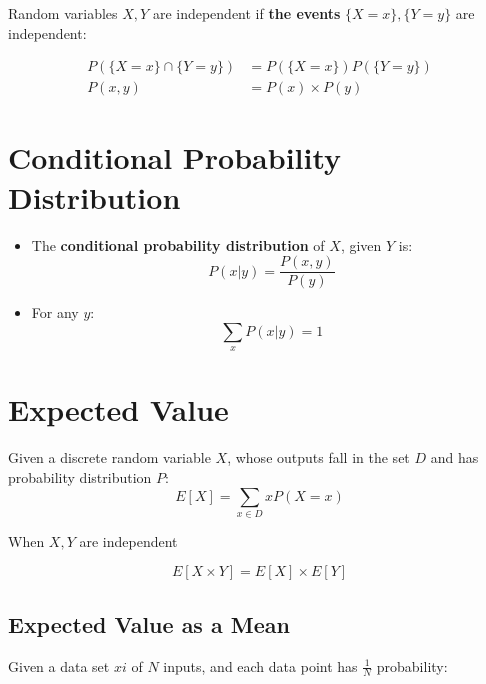   Random variables $ X, Y $ are independent if \textbf{the events} $ \{ X = x \}, \{ Y = y \} $ are independent:

  \begin{align}
    P(\{ X = x \} \cap \{ Y = y \}) &= P(\{ X = x \}) P(\{ Y = y \}) \\
    P(x,y) &= P(x) \times P(y)
  \end{align}

\section{Conditional Probability Distribution}

  \begin{itemize}
    \item The \textbf{conditional probability distribution} of $ X $, given $ Y $ is:
    \begin{equation}
      P(x | y) = \frac{ P(x, y) }{ P(y) }
    \end{equation}

    \item For any $ y $:
    \begin{equation}
      \sum_{x} P(x | y) = 1
    \end{equation}
  \end{itemize}

\section{Expected Value}

  Given a discrete random variable $ X $, whose outputs fall in the set $ D $ and has probability distribution $ P $:
  \begin{equation}
    E \left[ X \right] = \sum_{x \in D} x P \left( X = x \right)
  \end{equation}

  When $ X, Y $ are independent

  \begin{equation}\label{eq-expected-values-of-independent-variables}
    E \left[ X \times Y \right] = E \left[ X \right] \times E \left[ Y \right]
  \end{equation}

  \subsection{Expected Value as a Mean}

    Given a data set $ x{i} $ of $ N $ inputs, and each data point has $ \frac{1}{N} $ probability:

